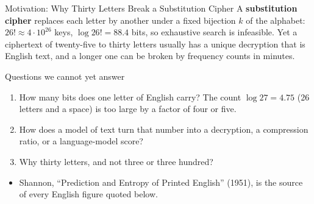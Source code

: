 \begin{frame}{Motivation: Why Thirty Letters Break a Substitution Cipher}
  \small
  A \textbf{substitution cipher} replaces each letter by another under a fixed bijection $k$ of the alphabet: $26!\approx4\cdot10^{26}$ keys, $\log26!=88.4$ bits, so exhaustive search is infeasible. Yet a ciphertext of twenty-five to thirty letters usually has a unique decryption that is English text, and a longer one can be broken by frequency counts in minutes.
  \begin{block}{Questions we cannot yet answer}
    \begin{enumerate}
      \item How many bits does one letter of English carry? The count $\log27=4.75$ (26 letters and a space) is too large by a factor of four or five.
      \item How does a model of text turn that number into a decryption, a compression ratio, or a language-model score?
      \item Why thirty letters, and not three or three hundred?
    \end{enumerate}
  \end{block}
  \begin{itemize}
    \item Shannon, ``Prediction and Entropy of Printed English'' (1951), is the source of every English figure quoted below.
  \end{itemize}
\end{frame}

